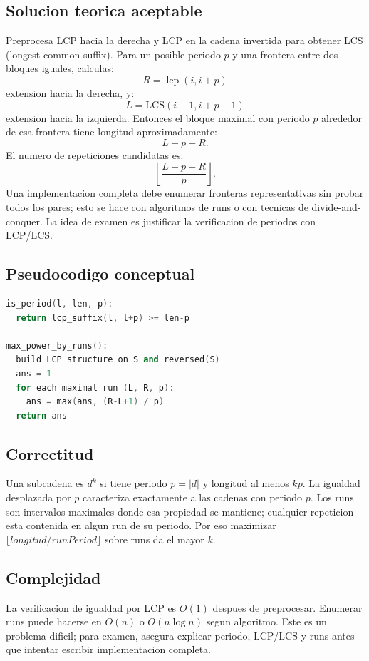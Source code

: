 \documentclass[10pt]{article}
\newcommand{\bigO}{O}
\newcommand{\lcp}{\operatorname{lcp}}
\begin{document}
\subsection{Solucion teorica aceptable}
Preprocesa LCP hacia la derecha y LCP en la cadena invertida para obtener LCS
(longest common suffix). Para un posible periodo $p$ y una frontera entre dos
bloques iguales, calculas:
\[
R=\lcp(i,i+p)
\]
extension hacia la derecha, y:
\[
L=\text{LCS}(i-1,i+p-1)
\]
extension hacia la izquierda. Entonces el bloque maximal con periodo $p$
alrededor de esa frontera tiene longitud aproximadamente:
\[
L+p+R.
\]
El numero de repeticiones candidatas es:
\[
\left\lfloor\frac{L+p+R}{p}\right\rfloor.
\]
Una implementacion completa debe enumerar fronteras representativas sin probar
todos los pares; esto se hace con algoritmos de runs o con tecnicas de
divide-and-conquer. La idea de examen es justificar la verificacion de periodos
con LCP/LCS.

\subsection{Pseudocodigo conceptual}
\begin{lstlisting}[language=C++]
is_period(l, len, p):
  return lcp_suffix(l, l+p) >= len-p

max_power_by_runs():
  build LCP structure on S and reversed(S)
  ans = 1
  for each maximal run (L, R, p):
    ans = max(ans, (R-L+1) / p)
  return ans
\end{lstlisting}

\subsection{Correctitud}
Una subcadena es $d^k$ si tiene periodo $p=|d|$ y longitud al menos $kp$. La
igualdad desplazada por $p$ caracteriza exactamente a las cadenas con periodo
$p$. Los runs son intervalos maximales donde esa propiedad se mantiene; cualquier
repeticion esta contenida en algun run de su periodo. Por eso maximizar
$\lfloor longitud/runPeriod\rfloor$ sobre runs da el mayor $k$.

\subsection{Complejidad}
La verificacion de igualdad por LCP es $\bigO(1)$ despues de preprocesar.
Enumerar runs puede hacerse en $\bigO(n)$ o $\bigO(n\log n)$ segun algoritmo.
Este es un problema dificil; para examen, asegura explicar periodo, LCP/LCS y
runs antes que intentar escribir implementacion completa.
\end{document}
